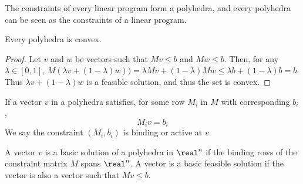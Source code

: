     The constraints of every linear program form a polyhedra, and every polyhedra can be seen as the constraints of a linear program.

    \begin{theorem}
        Every polyhedra is convex.
    \end{theorem}
    \begin{proof}
        Let $v$ and $w$ be vectors such that $Mv \leq b$ and $Mw \leq b$. Then, for any $\lambda \in [0,1]$, $M(\lambda v + (1 - \lambda) w)) = \lambda Mv + (1 - \lambda)Mw \leq \lambda b + (1 - \lambda) b = b$. Thus $\lambda v + (1 - \lambda) w$ is a feasible solution, and thus the set is convex.
    \end{proof}

    \begin{definition}
        If a vector $v$ in a polyhedra satisfies, for some row $M_i$ in $M$ with corresponding $b_i$,
        \[ M_iv = b_i \]
        We say the constraint $(M_i,b_i)$ is binding or active at $v$.
    \end{definition}

    \begin{definition}
        A vector $v$ is a basic solution of a polyhedra in $\real^n$ if the binding rows of the constraint matrix $M$ spans $\real^n$. A vector is a basic feasible solution if the vector is also a vector such that $Mv \leq b$.
    \end{definition}

